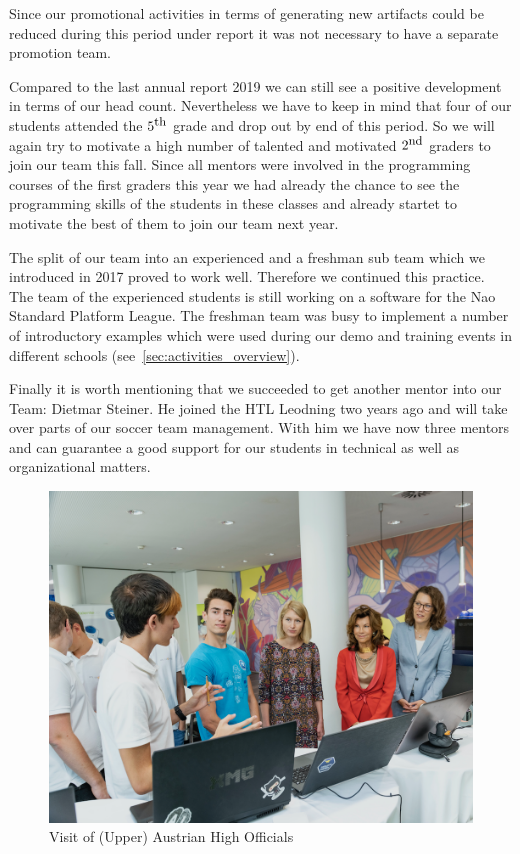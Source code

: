 \documentclass[11pt]{article}
\begin{document}
\noindent Since our promotional activities in terms of generating new artifacts could be reduced during this period under report it was not necessary to have a separate promotion team.

Compared to the last annual report 2019 we can still see a positive development in terms of our head count. Nevertheless we have to keep in mind that four of our students attended the $5^{\textrm{\small th}}$ grade and drop out by end of this period. So we will again try to motivate a high number of talented and motivated $2^{\textrm{\small nd}}$ graders to join our team this fall. Since all mentors were involved in the programming courses of the first graders this year we had already the chance to see the programming skills of the students in these classes and already startet to motivate the best of them to join our team next year.

The split of our team into an experienced and a freshman sub team which we introduced in 2017 proved to work well. Therefore we continued this practice. The team of the experienced students is still  working on a software for the Nao Standard Platform League. The freshman team was busy to implement a number of introductory examples which were used during our demo and training events in different schools (see~\ref{sec:activities_overview}).

Finally it is worth mentioning that we succeeded to get another mentor into our Team: Dietmar Steiner. He joined the HTL Leodning two years ago and will take over parts of our soccer team management. With him we have now three mentors and can guarantee a good support for our students in technical as well as organizational matters.

\begin{figure}
\begin{center}
\includegraphics[scale=0.25]{img/activityImage1.png}
\end{center}
\caption{Visit of (Upper) Austrian High Officials}
\label{fig:ballDerLeondinger}
\end{figure}
\end{document}
